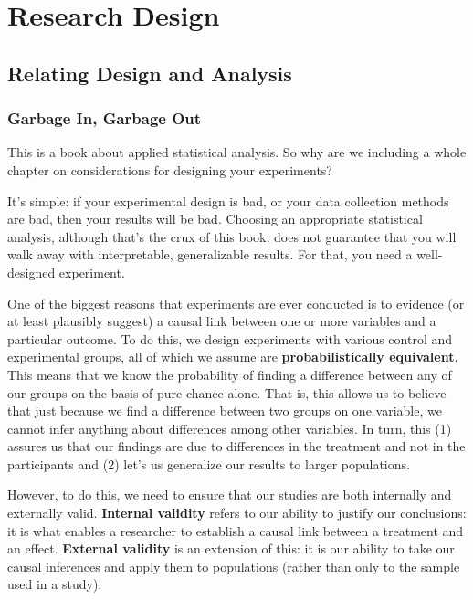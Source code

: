 
\chapter[Research Design]{Research Design}
\section{Relating Design and Analysis}

\subsection{Garbage In, Garbage Out}
This is a book about applied statistical analysis. So why are we including a whole chapter on considerations for designing your experiments?

It's simple: if your experimental design is bad, or your data collection methods are bad, then your results will be bad. Choosing an appropriate statistical analysis, although that's the crux of this book, does not guarantee that you will walk away with interpretable, generalizable results. For that, you need a well-designed experiment.

One of the biggest reasons that experiments are ever conducted is to evidence (or at least plausibly suggest) a causal link between one or more variables and a particular outcome. To do this, we design experiments with various control and experimental groups, all of which we assume are \textbf{probabilistically equivalent}. This means that we know the probability of finding a difference between any of our groups on the basis of pure chance alone. That is, this allows us to believe that just because we find a difference between two groups on one variable, we cannot infer anything about differences among other variables. In turn, this (1) assures us that our findings are due to differences in the treatment and not in the participants and (2) let's us generalize our results to larger populations.

However, to do this, we need to ensure that our studies are both internally and externally valid. \textbf{Internal validity} refers to our ability to justify our conclusions: it is what enables a researcher to establish a causal link between a treatment and an effect. \textbf{External validity} is an extension of this: it is our ability to take our causal inferences and apply them to populations (rather than only to the sample used in a study).


